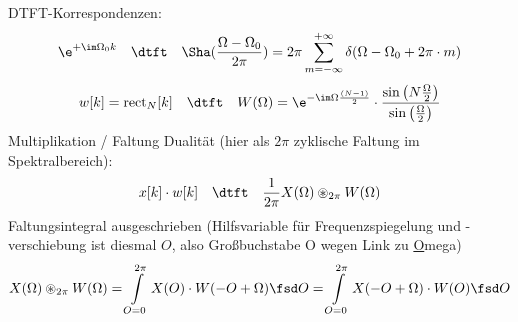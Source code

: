 \begin{Werkzeug}
DTFT-Korrespondenzen:
\begin{align}
\e^{+\im\Omega_0 k} \quad\dtft\quad \Sha(\frac{\Omega-\Omega_0}{2\pi})
= 2\pi \sum\limits_{m=-\infty}^{+\infty}
\delta(\Omega-\Omega_0 + 2\pi\cdot m)
\end{align}
%
\begin{equation}
w[k] = \mathrm{rect}_N[k]
\quad\dtft\quad
W(\Omega)=\e^{-\im\Omega\frac{(N-1)}{2}}\cdot\frac{\sin\left(N\frac{\Omega}{2}\right)}{\sin\left(\frac{\Omega}{2}\right)}
\end{equation}
%
Multiplikation / Faltung Dualität (hier als $2\pi$ zyklische Faltung im Spektralbereich):
\begin{align}
x[k] \cdot w[k] \quad\dtft\quad \frac{1}{2\pi} X(\Omega) \circledast_{2\pi} W(\Omega)
\end{align}
%
Faltungsintegral ausgeschrieben (Hilfsvariable für Frequenzspiegelung und -verschiebung
ist diesmal $O$, also Großbuchstabe O wegen Link zu \underline{O}mega)
\begin{align}
X(\Omega) \circledast_{2\pi} W(\Omega) =
\int\limits_{O=0}^{2\pi} X(O) \cdot W(-O + \Omega) \fsd O =
\int\limits_{O=0}^{2\pi} X(-O+\Omega) \cdot W(O) \fsd O
\end{align}
\end{Werkzeug}
